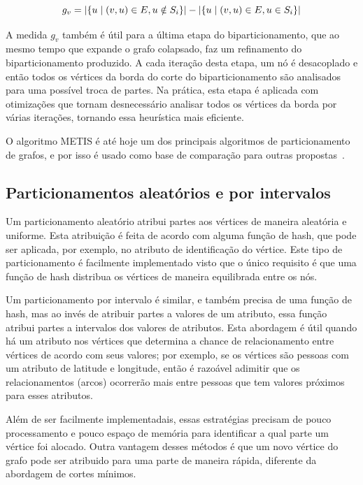 \documentclass[conference]{IEEEtran}
\DeclarePairedDelimiter\abs{\lvert}{\rvert}
\begin{document}
\begin{equation}
    g_v = \abs{\{u \mid (v, u) \in E, u \notin S_i\}} - 
          \abs{\{u \mid (v, u) \in E, u \in S_i\}} 
\end{equation}

A medida $g_v$ também é útil para a última etapa do biparticionamento, 
que ao mesmo tempo que expande o grafo colapsado, faz um refinamento do 
biparticionamento produzido. A cada iteração desta etapa, um nó é 
desacoplado e então todos os vértices da borda do corte do 
biparticionamento são analisados para uma possível troca de partes. Na
prática, esta etapa é aplicada com otimizações que tornam desnecessário
analisar todos os vértices da borda por várias iterações, tornando essa
heurística mais eficiente.

O algoritmo METIS é até hoje um dos principais algoritmos de 
particionamento de grafos, e por isso é usado como base de comparação 
para outras propostas~\cite{baselinemetis}.


\subsection{Particionamentos aleatórios e por intervalos}
Um particionamento aleatório atribui partes aos vértices de maneira 
aleatória e uniforme. Esta atribuição é feita de acordo com alguma 
função de hash, que pode ser aplicada, por exemplo, no atributo
de identificação do vértice. Este tipo de particionamento é facilmente 
implementado visto que o único requisito é que uma função de hash 
distribua os vértices de maneira equilibrada entre os nós.

Um particionamento por intervalo é similar, e também precisa de uma 
função de hash, mas ao invés de atribuir partes a valores de um 
atributo, essa função atribui partes a intervalos dos valores de 
atributos. Esta abordagem é útil quando há um atributo nos vértices que
determina a chance de relacionamento entre vértices de acordo com 
seus valores; por exemplo, se os vértices são pessoas com um atributo
de latitude e longitude, então é razoável adimitir que os 
relacionamentos (arcos) ocorrerão mais entre pessoas que tem valores
próximos para esses atributos.

Além de ser facilmente implementadais, essas estratégias precisam de 
pouco processamento e pouco espaço de memória para identificar a qual 
parte um vértice foi alocado. Outra vantagem desses métodos é que um 
novo vértice do grafo pode ser atribuido para uma parte de maneira 
rápida, diferente da abordagem de cortes mínimos.
\end{document}
